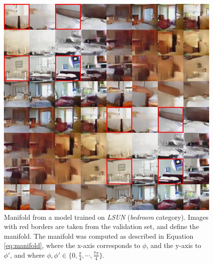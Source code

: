 \documentclass{article}
\begin{document}
\begin{figure}[H]
\vspace{80pt}
    \centering \includegraphics[width=1.\textwidth]{bedroom_manifold_highlight.jpg}
    \caption{Manifold from a model trained on \emph{LSUN} (\emph{bedroom} category). Images with red borders are taken from the validation set, and define the manifold. The manifold was computed as described in Equation \ref{eq:manifold}, where the x-axis corresponds to $\phi$, and the y-axis to $\phi'$, and where $\phi, \phi' \in \{0, \frac{\pi}{4}, \cdots, \frac{7\pi}{4}\}$. }
\end{figure}
\end{document}
